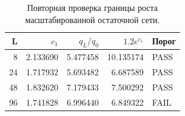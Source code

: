 \begin{table}[H]\centering\small
\setlength{\tabcolsep}{4pt}
\caption{Повторная проверка границы роста масштабированной остаточной сети.}\label{tab:repeat_growth}
\begin{tabular}{rrrrl}
\toprule
L & $c_1$ & $q_L/q_0$ & $1.2e^{c_1}$ & Порог \\
\midrule
8 & 2.133690 & 5.477458 & 10.135174 & PASS \\
24 & 1.717932 & 5.693482 & 6.687589 & PASS \\
48 & 1.832620 & 7.179433 & 7.500292 & PASS \\
96 & 1.741828 & 6.996440 & 6.849322 & FAIL \\
\bottomrule
\end{tabular}
\end{table}
